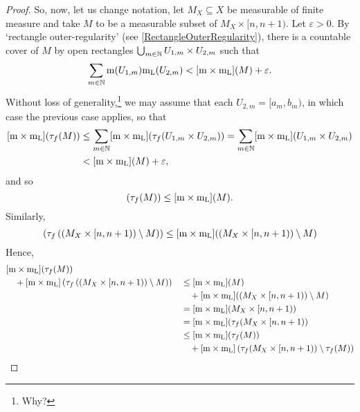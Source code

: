 \begin{thm}[Integral]
\begin{proof}
So, now, let us change notation, let $M_X\subseteq X$ be measurable of finite measure and take $M$ to be a measurable subset of $M_X\times [n,n+1)$.  Let $\varepsilon >0$.  By `rectangle outer-regularity' (see \eqref{RectangleOuterRegularity}), there is a countable cover of $M$ by open rectangles $\bigcup _{m\in \mathbb{N}}U_{1,m}\times U_{2,m}$ such that
\begin{equation}
\sum _{m\in \mathbb{N}}\mathrm{m} (U_{1,m})\mathrm{m} _{\mathrm{L}}(U_{2,m})<[\mathrm{m} \times \mathrm{m} _{\mathrm{L}}](M)+\varepsilon .
\end{equation}
Without loss of generality,\footnote{Why?} we may assume that each $U_{2,m}=[a_m,b_m)$, in which case the previous case applies, so that
\begin{equation}
\begin{split}
[\mathrm{m} \times \mathrm{m} _{\mathrm{L}}](\tau _f(M))& \leq \sum _{m\in \mathbb{N}}[\mathrm{m} \times \mathrm{m} _{\mathrm{L}}](\tau _f(U_{1,m}\times U_{2,m}))=\sum _{m\in \mathbb{N}}[\mathrm{m} \times \mathrm{m} _{\mathrm{L}}](U_{1,m}\times U_{2,m}) \\
& <[\mathrm{m} \times \mathrm{m} _{\mathrm{L}}](M)+\varepsilon ,
\end{split}
\end{equation}
and so
\begin{equation}
[\meas \times \meas _{\mathrm{L}}](\tau _f(M))\leq [\meas \times \meas _{\mathrm{L}}](M).
\end{equation}
Similarly,
\begin{equation}
[\meas \times \meas _{\mathrm{L}}]\left( \tau _f\left( (M_X\times [n,n+1))\setminus M\right) \right) \leq [\meas \times \meas _{\mathrm{L}}]((M_X\times [n,n+1))\setminus M)
\end{equation}
Hence,
\begin{equation}
\begin{split}
& [\meas \times \meas _{\mathrm{L}}](\tau _f(M)) & & \\
& \quad +[\meas \times \meas _{\mathrm{L}}]\left( \tau _f\left( (M_X\times [n,n+1))\setminus M\right) \right) & & \leq [\meas \times \meas _{\mathrm{L}}](M) \\
& & & \quad +[\meas \times \meas _{\mathrm{L}}]((M_X\times [n,n+1))\setminus M) \\
& & & =[\meas \times \meas _{\mathrm{L}}](M_X\times [n,n+1)) \\
& & & =[\meas \times \meas _{\mathrm{L}}](\tau _f(M_X\times [n,n+1)) \\
& & & \leq [\meas \times \meas _{\mathrm{L}}](\tau _f(M)) \\
& & & \quad +[\meas \times \meas _{\mathrm{L}}]\left( \tau _f(M_X\times [n,n+1))\setminus \tau _f(M)\right) \\

\end{split}
\end{equation}
\end{proof}
\end{thm}
